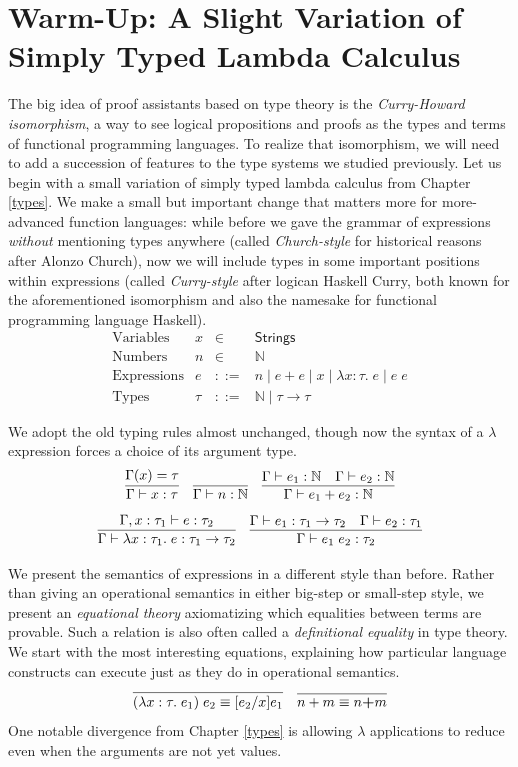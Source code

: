 \documentclass{amsbook}
\theoremstyle{definition}
\theoremstyle{remark}
\numberwithin{section}{chapter}
\numberwithin{equation}{chapter}
\begin{document}
\section{Warm-Up: A Slight Variation of Simply Typed Lambda Calculus}

The big idea of proof assistants based on type theory is the \emph{Curry-Howard isomorphism}, a way to see logical propositions and proofs as the types and terms of functional programming languages.
To realize that isomorphism, we will need to add a succession of features to the type systems we studied previously.
Let us begin with a small variation of simply typed lambda calculus from Chapter \ref{types}.
We make a small but important change that matters more for more-advanced function languages: while before we gave the grammar of expressions \emph{without} mentioning types anywhere (called \emph{Church-style} for historical reasons after Alonzo Church), now we will include types in some important positions within expressions (called \emph{Curry-style} after logican Haskell Curry, both known for the aforementioned isomorphism and also the namesake for functional programming language Haskell).
$$\begin{array}{rrcl}
  \textrm{Variables} & x &\in& \mathsf{Strings} \\
  \textrm{Numbers} & n &\in& \mathbb N \\
  \textrm{Expressions} & e &::=& n \mid e + e \mid x \mid \lambda x : \tau. \; e \mid e \; e \\
  \textrm{Types} & \tau &::=& \mathbb N \mid \tau \to \tau
\end{array}$$

We adopt the old typing rules almost unchanged, though now the syntax of a $\lambda$ expression forces a choice of its argument type.
$$\infer{\hasty{\Gamma}{x}{\tau}}{
  \msel{\Gamma}{x} = \tau
}
\quad \infer{\hasty{\Gamma}{n}{\mathbb N}}{}
\quad \infer{\hasty{\Gamma}{e_1 + e_2}{\mathbb N}}{
    \hasty{\Gamma}{e_1}{\mathbb N}
    & \hasty{\Gamma}{e_2}{\mathbb N}
}$$
$$\infer{\hasty{\Gamma}{\lambda x : \tau_1. \; e}{\tau_1 \to \tau_2}}{
  \hasty{\Gamma, x : \tau_1}{e}{\tau_2}
}
\quad \infer{\hasty{\Gamma}{e_1 \; e_2}{\tau_2}}{
  \hasty{\Gamma}{e_1}{\tau_1 \to \tau_2}
  & \hasty{\Gamma}{e_2}{\tau_1}
}$$

We present the semantics of expressions in a different style than before.
Rather than giving an operational semantics in either big-step or small-step style, we present an \emph{equational theory} axiomatizing which equalities between terms are provable.
Such a relation is also often called a \emph{definitional equality} in type theory.
We start with the most interesting equations, explaining how particular language constructs can execute just as they do in operational semantics.
$$\infer{(\lambda x : \tau. \; e_1) \; e_2 \equiv \subst{e_1}{x}{e_2}}{}
\quad \infer{n + m \equiv n \textbf{+} m}{}$$
One notable divergence from Chapter \ref{types} is allowing $\lambda$ applications to reduce even when the arguments are not yet values.
\end{document}
